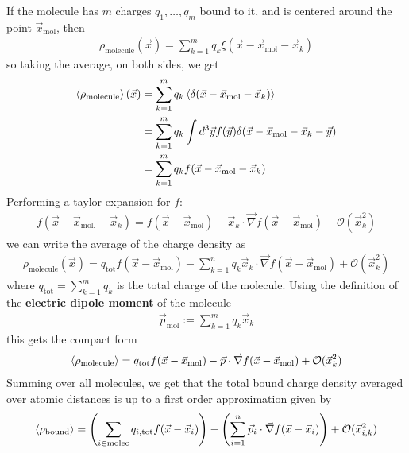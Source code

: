 If the molecule has $m$ charges $q_1, \ldots, q_m$ bound to it, and is centered around the point $\vec{x}_{\text{mol}}$, then 
\begin{align*}
  \rho_{\text{molecule}}(\vec{x}) = \sum_{k = 1}^{m} q_{k} \xi(\vec{x} - \vec{x}_{\text{mol}} - \vec{x}_k )
\end{align*}
so taking the average, on both sides, we get 
\begin{align*}
  \left\langle\rho_{\text{molecule}}\right\rangle(\vec{x}) 
  &= \sum_{k=1}^{m} q_k\left\langle\delta(\vec{x} - \vec{x}_{\text{mol}} - \vec{x}_k)\right\rangle\\
  &= \sum_{k=1}^{m} q_k \int d^{3} \vec{y} f(\vec{y}) \delta(\vec{x} - \vec{x}_{\text{mol}} - \vec{x}_{k} - \vec{y})\\
  &=
  \sum_{k=1}^{m} q_k f(\vec{x} - \vec{x}_{\text{mol}} - \vec{x}_k)
\end{align*}
Performing a taylor expansion for $f$:
\begin{align*}
  f(\vec{x} - \vec{x}_{\text{mol.}} - \vec{x}_k) = f(\vec{x} - \vec{x}_{\text{mol}}) - \vec{x}_k \cdot \vec{\nabla} f(\vec{x} - \vec{x}_{\text{mol}}) + \mathcal{O}(\vec{x}_k^{2})
\end{align*}
we can write the average of the charge density as
\begin{align*}
  \rho_{\text{molecule}}(\vec{x}) = q_{\text{tot}}f(\vec{x} - \vec{x}_{\text{mol}}) - \sum_{k=1}^{n}q_k \vec{x}_k \cdot \vec{\nabla}f(\vec{x} - \vec{x}_{\text{mol}}) + \mathcal{O}(\vec{x}_k^{2})
\end{align*}
where $q_{\text{tot}} = \sum_{k=1}^{m} q_k$ is the total charge of the molecule.
Using the definition of the \textbf{electric dipole moment} of the molecule
\begin{align*}
  \vec{p}_{\text{mol}} := \sum_{k=1}^{m} q_k \vec{x}_k
\end{align*}
this gets the compact form
\begin{align*}
  \left\langle\rho_{\text{molecule}}\right\rangle = q_{\text{tot}} f(\vec{x} - \vec{x}_{\text{mol}}) - \vec{p} \cdot \vec{\nabla}f(\vec{x} - \vec{x}_{\text{mol}}) + \mathcal{O}(\vec{x}_k^{2})
\end{align*}
Summing over all molecules,
we get that the total bound charge density averaged over atomic distances is up to a first order approximation given by
\begin{align*}
  \left\langle\rho_{\text{bound}}\right\rangle 
= 
  \left(
    \sum_{i \in \text{molec}}q_{i,\text{tot}} f(\vec{x} - \vec{x}_i)
  \right) 
- 
  \left(
    \sum_{i=1}^{n}
    \vec{p}_i \cdot \vec{\nabla} f(\vec{x}- \vec{x}_i)
  \right)
  + \mathcal{O}(\vec{x}_{i,k}^{2})
\end{align*}
